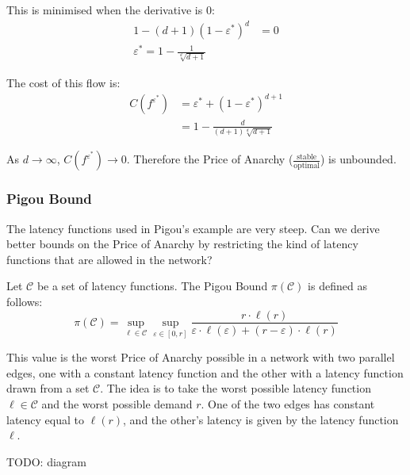 This is minimised when the derivative is 0:
\begin{equation*}
	\begin{split}
		1 - (d+1)(1-\varepsilon^*)^d & = 0 \\
		\varepsilon^* = 1 - \frac{1}{\sqrt[d]{d+1}}
	\end{split}
\end{equation*}

The cost of this flow is:
\begin{equation*}
	\begin{split}
		C(f^{\varepsilon^*}) & = \varepsilon^* + (1-\varepsilon^*)^{d+1} \\
		& = 1 - \frac{d}{(d+1)\sqrt[d]{d+1}}
	\end{split}
\end{equation*}

As $d \rightarrow \infty$, $C(f^{\varepsilon^*}) \rightarrow 0$. Therefore the
Price of Anarchy ($\frac{\text{stable}}{\text{optimal}}$) is unbounded.

\subsubsection{Pigou Bound}

The latency functions used in Pigou's example are very steep. Can we derive
better bounds on the Price of Anarchy by restricting the kind of
latency functions that are allowed in the network?

\begin{definition}
	Let $\mathcal{C}$ be a set of latency functions. The Pigou Bound
	$\pi(\mathcal{C})$ is defined as follows:
	\begin{equation}
		\pi(\mathcal{C}) = \sup_{\ell \in \mathcal{C}} \sup_{\varepsilon \in
		[0, r]}
		\frac{r \cdot \ell(r)}{\varepsilon \cdot \ell(\varepsilon) +
		(r-\varepsilon) \cdot \ell(r)}
	\end{equation}
\end{definition}

This value is the worst Price of Anarchy possible in a network with two
parallel edges, one with a constant latency function and the other with a
latency function drawn from a set $\mathcal{C}$. The idea is to take the worst
possible latency function $\ell \in \mathcal{C}$ and the worst possible demand
$r$. One of the two edges has constant latency equal to $\ell(r)$, and the
other's latency is given by the latency function $\ell$.

TODO: diagram

